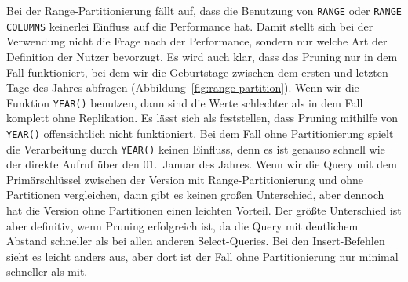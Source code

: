 Bei der Range-Partitionierung fällt auf, dass die Benutzung von \texttt{RANGE} oder \texttt{RANGE COLUMNS} keinerlei Einfluss auf die Performance hat.
Damit stellt sich bei der Verwendung nicht die Frage nach der Performance, sondern nur welche Art der Definition der Nutzer bevorzugt.
Es wird auch klar, dass das Pruning nur in dem Fall funktioniert, bei dem wir die Geburtstage zwischen dem ersten und letzten Tage des Jahres abfragen (Abbildung~\ref{fig:range-partition}).
Wenn wir die Funktion \texttt{YEAR()} benutzen, dann sind die Werte schlechter als in dem Fall komplett ohne Replikation.
Es lässt sich als feststellen, dass Pruning mithilfe von \texttt{YEAR()} offensichtlich nicht funktioniert.
Bei dem Fall ohne Partitionierung spielt die Verarbeitung durch \texttt{YEAR()} keinen Einfluss, denn es ist genauso schnell wie der direkte Aufruf über den 01.\ Januar des Jahres.
Wenn wir die Query mit dem Primärschlüssel zwischen der Version mit Range-Partitionierung und ohne Partitionen vergleichen, dann gibt es keinen großen Unterschied, aber dennoch hat die Version ohne Partitionen einen leichten Vorteil.
Der größte Unterschied ist aber definitiv, wenn Pruning erfolgreich ist, da die Query mit deutlichem Abstand schneller als bei allen anderen Select-Queries.
Bei den Insert-Befehlen sieht es leicht anders aus, aber dort ist der Fall ohne Partitionierung nur minimal schneller als mit.

